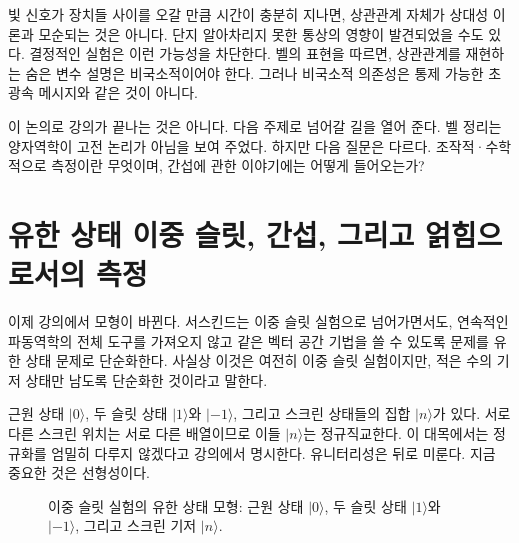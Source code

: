 빛 신호가 장치들 사이를 오갈 만큼 시간이 충분히 지나면, 상관관계 자체가 상대성 이론과 모순되는 것은 아니다. 단지 알아차리지 못한 통상의 영향이 발견되었을 수도 있다. 결정적인 실험은 이런 가능성을 차단한다. 벨의 표현을 따르면, 상관관계를 재현하는 숨은 변수 설명은 비국소적이어야 한다. 그러나 비국소적 의존성은 통제 가능한 초광속 메시지와 같은 것이 아니다.

\begin{classroomqa}\end{classroomqa}

이 논의로 강의가 끝나는 것은 아니다. 다음 주제로 넘어갈 길을 열어 준다. 벨 정리는 양자역학이 고전 논리가 아님을 보여 주었다. 하지만 다음 질문은 다르다. 조작적·수학적으로 측정이란 무엇이며, 간섭에 관한 이야기에는 어떻게 들어오는가?

\section{유한 상태 이중 슬릿, 간섭, 그리고 얽힘으로서의 측정}

이제 강의에서 모형이 바뀐다. 서스킨드는 이중 슬릿 실험으로 넘어가면서도, 연속적인 파동역학의 전체 도구를 가져오지 않고 같은 벡터 공간 기법을 쓸 수 있도록 문제를 유한 상태 문제로 단순화한다. 사실상 이것은 여전히 이중 슬릿 실험이지만, 적은 수의 기저 상태만 남도록 단순화한 것이라고 말한다.

근원 상태 \(|0\rangle\), 두 슬릿 상태 \(|1\rangle\)와 \(|-1\rangle\), 그리고 스크린 상태들의 집합 \(|n\rangle\)가 있다. 서로 다른 스크린 위치는 서로 다른 배열이므로 이들 \(|n\rangle\)는 정규직교한다. 이 대목에서는 정규화를 엄밀히 다루지 않겠다고 강의에서 명시한다. 유니터리성은 뒤로 미룬다. 지금 중요한 것은 선형성이다.

\begin{figure}[htbp]\centering
{}\caption{이중 슬릿 실험의 유한 상태 모형: 근원 상태 \(|0\rangle\), 두 슬릿 상태 \(|1\rangle\)와 \(|-1\rangle\), 그리고 스크린 기저 \(|n\rangle\).}\end{figure}

